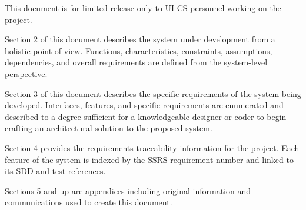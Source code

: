 	This document is for limited release only to UI CS personnel
	working on the project.

		Section 2 of this document describes the system under development
		from a holistic point of view.  Functions, characteristics,
		constraints, assumptions, dependencies, and overall requirements
		are defined from the system-level perspective.

		Section 3 of this document describes the specific requirements of
		the system being developed.  Interfaces, features, and specific
		requirements are enumerated and described to a degree sufficient
		for a knowledgeable designer or coder to begin crafting an
		architectural solution to the proposed system.

		Section 4 provides the requirements traceability information for
		the project.  Each feature of the system is indexed by the SSRS
		requirement number and linked to its SDD and test references.

		Sections 5 and up are appendices including original information
		and communications used to create this document.